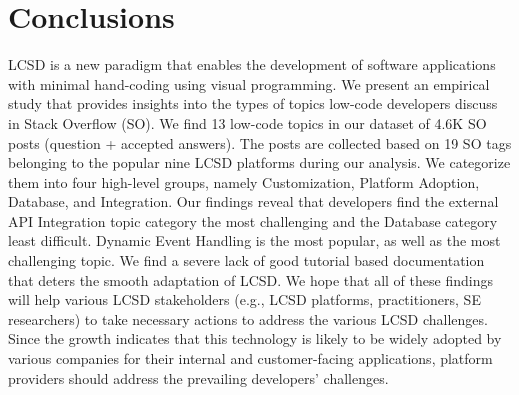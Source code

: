 \section{Conclusions} \label{sec:conclusion}
LCSD is a new paradigm that enables the development of
software applications with minimal hand-coding using visual programming. We present an empirical study that provides insights into the types of topics low-code developers discuss in Stack Overflow (SO). We find 13 low-code topics in our dataset of 4.6K SO posts (question + accepted answers). The posts are collected based on 19 SO tags belonging to the popular nine  LCSD platforms during our analysis. We categorize them into four high-level groups, namely Customization, Platform Adoption, Database, and Integration. Our findings reveal that developers find the external API Integration topic category the most challenging and the Database category least difficult. Dynamic Event Handling is the most popular, as well as the most challenging topic. We find a severe lack of good tutorial based documentation that deters the smooth adaptation of LCSD. We hope that all of these findings will help various  LCSD stakeholders (e.g.,  LCSD platforms, practitioners, SE researchers) to take necessary actions to address the various  LCSD challenges. Since the growth indicates that this technology is likely to be widely adopted by various companies for their internal and customer-facing applications, platform providers should address the prevailing developers' challenges.



